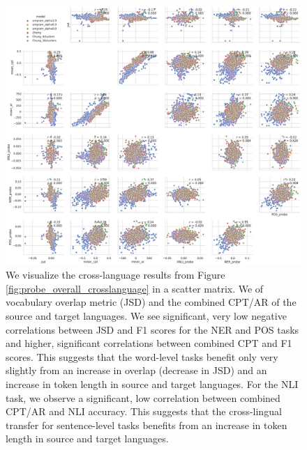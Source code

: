 \begin{figure}[H]
    \centering
    \includegraphics[width=\textwidth]{figures/probe_detailed_crosslanguage_scattermatrix.pdf}
    \caption{We visualize the cross-language results from Figure \ref{fig:probe_overall_crosslanguage} in a scatter matrix. We  of vocabulary overlap metric (JSD) and the combined CPT/AR of the source and target languages. We see significant, very low negative correlations between JSD and F1 scores for the NER and POS tasks and higher, significant correlations between combined CPT and F1 scores. This suggests that the word-level tasks benefit only very slightly from an increase in overlap (decrease in JSD) and an increase in token length in source and target languages. For the NLI task, we observe a significant, low correlation between combined CPT/AR and NLI accuracy. This suggests that the cross-lingual transfer for sentence-level tasks benefits from an increase in token length in source and target languages.}
    \label{fig:probe_overall_crosslanguage_scattermatrix}
\end{figure}



